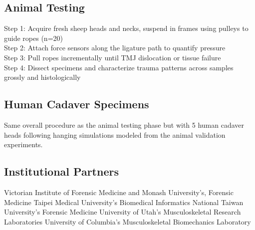 \documentclass{article}
\begin{document}
\subsection{Animal Testing}

\begin{outline}

\1 Step 1: Acquire fresh sheep heads and necks, suspend in frames using pulleys to guide ropes (n=20) \\

\1 Step 2: Attach force sensors along the ligature path to quantify pressure \\

\1 Step 3: Pull ropes incrementally until TMJ dislocation or tissue failure \\

\1 Step 4: Dissect specimens and characterize trauma patterns across samples grossly and histologically\\

\end{outline}

%
\subsection{Human Cadaver Specimens} 

Same overall procedure as the animal testing phase but with 5 human cadaver heads following hanging simulations modeled from the animal validation experiments.

%
\subsection{Institutional Partners}

\begin{outline}



\1 Victorian Institute of Forensic Medicine and Monash University's, Forensic Medicine
\1 Taipei Medical University's Biomedical Informatics
\1 National Taiwan University's Forensic Medicine
\1 University of Utah’s Musculoskeletal Research Laboratories
\1 University of Columbia’s Musculoskeletal Biomechanics Laboratory


\end{outline}
\end{document}
